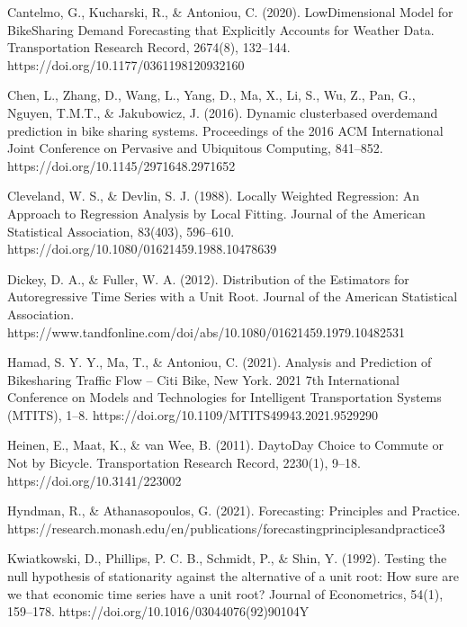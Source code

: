 \documentclass[letterpaper,10pt,english]{jupyterBook}
\begin{document}
\sphinxAtStartPar
Cantelmo, G., Kucharski, R., \& Antoniou, C. (2020). Low\sphinxhyphen{}Dimensional Model for Bike\sphinxhyphen{}Sharing Demand Forecasting that Explicitly Accounts for Weather Data. Transportation Research Record, 2674(8), 132–144. https://doi.org/10.1177/0361198120932160

\sphinxAtStartPar
Chen, L., Zhang, D., Wang, L., Yang, D., Ma, X., Li, S., Wu, Z., Pan, G., Nguyen, T.\sphinxhyphen{}M.\sphinxhyphen{}T., \& Jakubowicz, J. (2016). Dynamic cluster\sphinxhyphen{}based over\sphinxhyphen{}demand prediction in bike sharing systems. Proceedings of the 2016 ACM International Joint Conference on Pervasive and Ubiquitous Computing, 841–852. https://doi.org/10.1145/2971648.2971652

\sphinxAtStartPar
Cleveland, W. S., \& Devlin, S. J. (1988). Locally Weighted Regression: An Approach to Regression Analysis by Local Fitting. Journal of the American Statistical Association, 83(403), 596–610. https://doi.org/10.1080/01621459.1988.10478639

\sphinxAtStartPar
Dickey, D. A., \& Fuller, W. A. (2012). Distribution of the Estimators for Autoregressive Time Series with a Unit Root. Journal of the American Statistical Association. https://www.tandfonline.com/doi/abs/10.1080/01621459.1979.10482531

\sphinxAtStartPar
Hamad, S. Y. Y., Ma, T., \& Antoniou, C. (2021). Analysis and Prediction of Bikesharing Traffic Flow – Citi Bike, New York. 2021 7th International Conference on Models and Technologies for Intelligent Transportation Systems (MT\sphinxhyphen{}ITS), 1–8. https://doi.org/10.1109/MT\sphinxhyphen{}ITS49943.2021.9529290

\sphinxAtStartPar
Heinen, E., Maat, K., \& van Wee, B. (2011). Day\sphinxhyphen{}to\sphinxhyphen{}Day Choice to Commute or Not by Bicycle. Transportation Research Record, 2230(1), 9–18. https://doi.org/10.3141/2230\sphinxhyphen{}02

\sphinxAtStartPar
Hyndman, R., \& Athanasopoulos, G. (2021). Forecasting: Principles and Practice. https://research.monash.edu/en/publications/forecasting\sphinxhyphen{}principles\sphinxhyphen{}and\sphinxhyphen{}practice\sphinxhyphen{}3

\sphinxAtStartPar
Kwiatkowski, D., Phillips, P. C. B., Schmidt, P., \& Shin, Y. (1992). Testing the null hypothesis of stationarity against the alternative of a unit root: How sure are we that economic time series have a unit root? Journal of Econometrics, 54(1), 159–178. https://doi.org/10.1016/0304\sphinxhyphen{}4076(92)90104\sphinxhyphen{}Y
\end{document}
